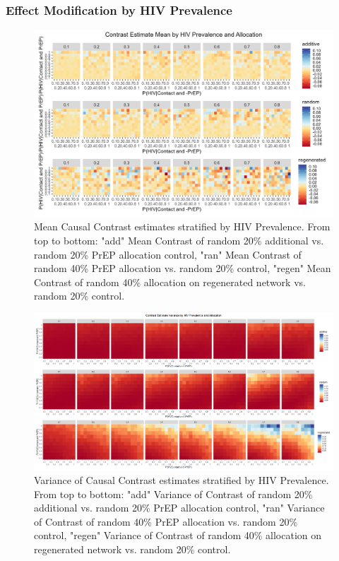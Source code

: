 \documentclass{article}
\theoremstyle{definition}
\begin{document}
\subsubsection{Effect Modification by HIV Prevalence}
\begin{figure}[H]
    \centering
    \includegraphics[scale=0.8]{Figures/HIV Prevalence Mean plots.png}
    \caption{Mean Causal Contrast estimates stratified by HIV Prevalence. From top to bottom: "add" Mean Contrast of random 20\% additional vs. random 20\% PrEP allocation control, "ran" Mean Contrast of random 40\% PrEP allocation vs. random 20\% control, "regen" Mean Contrast of random 40\% allocation on regenerated network vs. random 20\% control.}
    \label{fig:Figure 11}
\end{figure}
\begin{figure}[H]
    \centering
    \includegraphics[scale=0.8]{Figures/HIV Prevalence Variance plots.png}
    \caption{Variance of Causal Contrast estimates stratified by HIV Prevalence. From top to bottom: "add" Variance of Contrast of random 20\% additional vs. random 20\% PrEP allocation control, "ran" Variance of Contrast of random 40\% PrEP allocation vs. random 20\% control, "regen" Variance of Contrast of random 40\% allocation on regenerated network vs. random 20\% control.}
    \label{fig:Figure 12}
\end{figure}
\end{document}

